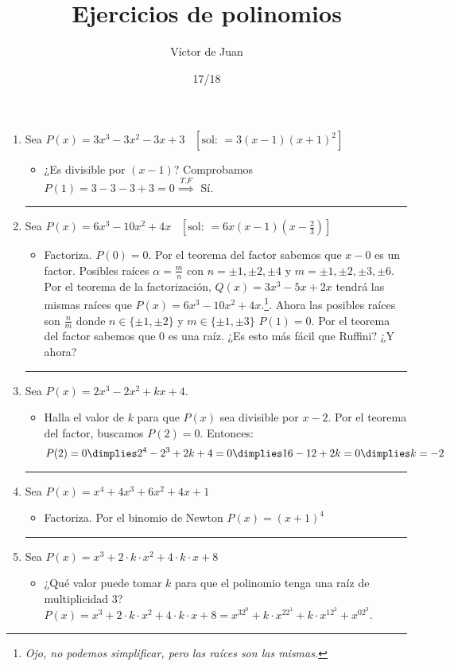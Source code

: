 \documentclass[palatino,nosec]{Docencia}
\title{Ejercicios de polinomios}
\author{Víctor de Juan}
\date{17/18}
\begin{document}
\begin{enumerate}

\item Sea $P(x) = 3x^3-3x^2-3x+3 \;\;\; [\text{sol: } = 3(x-1)(x+1)^2]$
\begin{itemize}
	\item ¿Es divisible por $(x-1)$? Comprobamos $P(1) = 3-3-3+3 = 0 \overset{T.F}{\implies}$ Sí.
\end{itemize}

\hrule

\item Sea $P(x) = 6x^3-10x^2+4x \;\;\; [\text{sol: } = 6x(x-1)(x-\frac{2}{3})]$
\begin{itemize}
	\item Factoriza.
	\subitem $P(0) = 0$. Por el teorema del factor sabemos que $x-0$ es un factor.
	\subitem Posibles raíces $α=\frac{m}{n}$ con $n=±1,\pm2,\pm4$ y $m=\pm1,\pm2,\pm3,\pm6$.	
	\subitem Por el teorema de la factorización, $Q(x) = 3x^3-5x+2x$ tendrá las mismas raíces que $P(x) = 6x^3-10x^2+4x$.\footnote{\textit{Ojo, no podemos simplificar, pero las raíces son las mismas.}}. Ahora las posibles raíces son $\frac{n}{m}$ donde $n\in\{\pm1,\pm2\}$ y $m\in\{\pm1,\pm3\}$
	\subitem $P(1) = 0$. Por el teorema del factor sabemos que $0$ es una raíz. ¿Es esto más fácil que Ruffini? ¿Y ahora?
\end{itemize}

\hrule

\item Sea $P(x) = 2x^3-2x^2+kx+4$.
\begin{itemize}
	\item Halla el valor de $k$ para que $P(x)$ sea divisible por $x-2$.
	\subitem Por el teorema del factor, buscamos $P(2) = 0$. Entonces:
	\[
		P(2) = 0 \dimplies 2^4-2^3+2k+4 = 0 \dimplies 16-12+2k = 0 \dimplies k = -2
	\]
\end{itemize}


\hrule

\item Sea $P(x) = x^4+4x^3+6x^2+4x+1$
\begin{itemize}
	\item Factoriza.
	\subitem Por el binomio de Newton $P(x) = (x+1)^4$
\end{itemize}

\hrule

\item Sea $P(x) = x^3+2·k·x^2+4·k·x+8$
\begin{itemize}
	\item ¿Qué valor puede tomar $k$ para que el polinomio tenga una raíz de multiplicidad 3?
	\subitem $P(x) = x^3+2·k·x^2+4·k·x+8 = x^32^0+k·x^22^1 + k·x^12^2 + x^02^3$. 


\end{itemize}
\end{enumerate}
\end{document}
